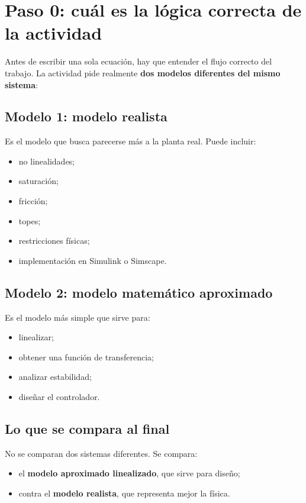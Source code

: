 \documentclass[11pt]{article}
\begin{document}
\section{Paso 0: cu\'al es la l\'ogica correcta de la actividad}

Antes de escribir una sola ecuaci\'on, hay que entender el flujo correcto del trabajo. La actividad pide realmente \textbf{dos modelos diferentes del mismo sistema}:

\subsection{Modelo 1: modelo realista}

Es el modelo que busca parecerse m\'as a la planta real. Puede incluir:

\begin{itemize}[leftmargin=1.2cm]
\item no linealidades;
\item saturaci\'on;
\item fricci\'on;
\item topes;
\item restricciones f\'isicas;
\item implementaci\'on en Simulink o Simscape.
\end{itemize}

\subsection{Modelo 2: modelo matem\'atico aproximado}

Es el modelo m\'as simple que sirve para:

\begin{itemize}[leftmargin=1.2cm]
\item linealizar;
\item obtener una funci\'on de transferencia;
\item analizar estabilidad;
\item dise\~nar el controlador.
\end{itemize}

\subsection{Lo que se compara al final}

No se comparan dos sistemas diferentes. Se compara:

\begin{itemize}[leftmargin=1.2cm]
\item el \textbf{modelo aproximado linealizado}, que sirve para dise\~no;
\item contra el \textbf{modelo realista}, que representa mejor la f\'isica.
\end{itemize}
\end{document}
